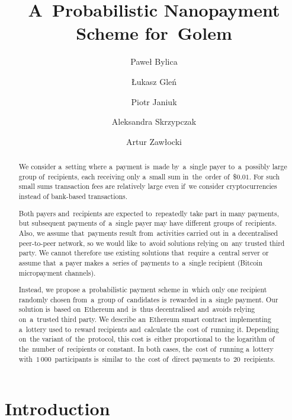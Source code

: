 \documentclass[a4paper]{article}
\title{A~Probabilistic Nanopayment Scheme for~Golem}
\author{Paweł Bylica}
\author{Łukasz Gleń}
\author{Piotr Janiuk}
\author{Aleksandra Skrzypczak}
\author{Artur Zawłocki}
\affil{imapp, \texttt{contact@golemproject.net}}
\begin{document}
\maketitle

\begin{abstract}
    We consider a~setting where a~payment  is~made by~a~single payer
    to~a~possibly large group of~recipients, each receiving only a~small
    sum in~the~order of~\$$0.01$. For such small sums transaction fees are
    relatively large even if~we consider cryptocurrencies instead of
    bank-based transactions.

    Both payers and~recipients are expected to~repeatedly take part in
    many payments, but subsequent payments of~a~single payer may
    have different groups of~recipients. Also, we
    assume that~payments result from~activities carried out in~a
    decentralised peer-to-peer network, so we would like to~avoid
    solutions relying on~any trusted third party. We cannot therefore use
    existing solutions that~require a~central server or assume that~a
    payer makes a~series of~payments to~a~single recipient (Bitcoin
    micropayment channels).

    Instead, we propose a~probabilistic payment scheme in~which only one
    recipient randomly chosen from~a~group of~candidates  is~rewarded in
    a~single payment. Our solution  is~based on~Ethereum and~is~thus
    decentralised and~avoids relying on~a~trusted third party. We describe
    an~Ethereum smart contract implementing a~lottery used to~reward
    recipients and~calculate the~cost of~running it. Depending on~the
    variant of~the~protocol, this cost  is~either proportional to~the
    logarithm of the~number of~recipients or constant. In both cases,
    the~cost of~running a~lottery with~$1\,000$~participants is~similar
    to~the~cost of~direct payments to~20~recipients.
\end{abstract}

\section{Introduction}
\label{sec:intro}
\end{document}
